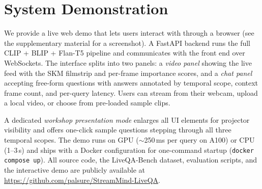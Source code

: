 \section*{System Demonstration}
\label{sec:demo}

We provide a live web demo that lets users interact with \ours through a browser (see the supplementary material for a screenshot).
A FastAPI backend runs the full CLIP + BLIP + Flan-T5 pipeline and communicates with the front end over WebSockets.
The interface splits into two panels: a \emph{video panel} showing the live feed with the SKM filmstrip and per-frame importance scores, and a \emph{chat panel} accepting free-form questions with answers annotated by temporal scope, context frame count, and per-query latency.
Users can stream from their webcam, upload a local video, or choose from pre-loaded sample clips.

A dedicated \emph{workshop presentation mode} enlarges all UI elements for projector visibility and offers one-click sample questions stepping through all three temporal scopes.
The demo runs on GPU ($\sim$250\,ms per query on A100) or CPU (1--3\,s) and ships with a Docker configuration for one-command startup (\texttt{docker compose up}).
All source code, the LiveQA-Bench dataset, evaluation scripts, and the interactive demo are publicly available at \url{https://github.com/palsure/StreamMind-LiveQA}.
